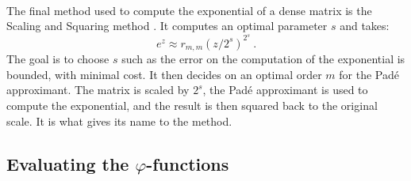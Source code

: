       \paragraph{}
      The final method used to compute the exponential of a dense matrix is the Scaling and Squaring method \cite{Higham2009}.
      It computes an optimal parameter $s$ and takes:
      \begin{equation}
        e^z \approx r_{m,m}\left(z/2^s\right)^{2^s} \ .
      \end{equation}
      The goal is to choose $s$ such as the error on the computation of the exponential is bounded, with minimal cost.
      It then decides on an optimal order $m$ for the Padé approximant.
      The matrix is scaled by $2^s$, the Padé approximant is used to compute the exponential, and the result is then squared back to the original scale.
      It is what gives its name to the method.


    \subsection{Evaluating the \texorpdfstring{$\varphi$}{phi}-functions}

